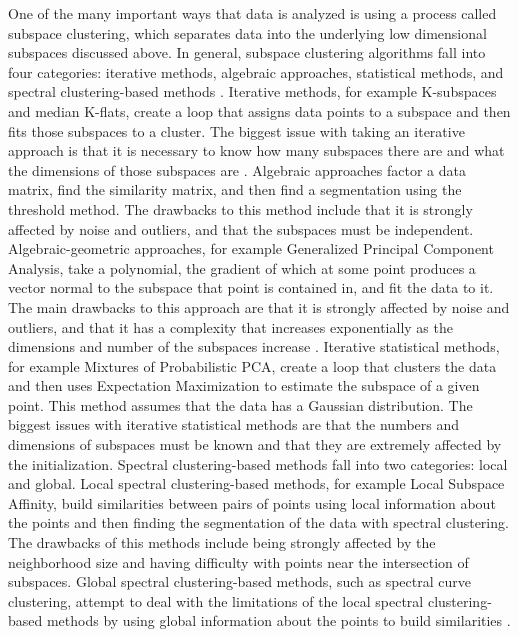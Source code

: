 \documentclass{article}
\begin{document}
One of the many important ways that data is analyzed is using a process called subspace clustering, which separates data into the underlying low dimensional subspaces discussed above. In general, subspace clustering algorithms fall into four categories: iterative methods, algebraic approaches, statistical methods, and spectral clustering-based methods \cite{elhamifar2012sparse}. Iterative methods, for example K-subspaces and median K-flats, create a loop that assigns data points to a subspace and then fits those subspaces to a cluster. The biggest issue with taking an iterative approach is that it is necessary to know how many subspaces there are and what the dimensions of those subspaces are \cite{elhamifar2012sparse}. Algebraic approaches factor a data matrix, find the similarity matrix, and then find a segmentation using the threshold method. The drawbacks to this method include that it is strongly affected by noise and outliers, and that the subspaces must be independent. Algebraic-geometric approaches, for example Generalized Principal Component Analysis, take a polynomial, the gradient of which at some point produces a vector normal to the subspace that point is contained in, and fit the data to it. The main drawbacks to this approach are that it is strongly affected by noise and outliers, and that it has a complexity that increases exponentially as the dimensions and number of the subspaces increase \cite{elhamifar2012sparse}. Iterative statistical methods, for example Mixtures of Probabilistic PCA, create a loop that clusters the data and then uses Expectation Maximization to estimate the subspace of a given point. This method assumes that the data has a Gaussian distribution. The biggest issues with iterative statistical methods are that the numbers and dimensions of subspaces must be known and that they are extremely affected by the initialization\cite{elhamifar2012sparse}. Spectral clustering-based methods fall into two categories: local and global. Local spectral clustering-based methods, for example Local Subspace Affinity, build similarities between pairs of points using local information about the points and then finding the segmentation of the data with spectral clustering. The drawbacks of this methods include being strongly affected by the neighborhood size and having difficulty with points near the intersection of subspaces. Global spectral clustering-based methods, such as spectral curve clustering, attempt to deal with the limitations of the local spectral clustering-based methods by using global information about the points to build similarities \cite{elhamifar2012sparse}.  
\end{document}
